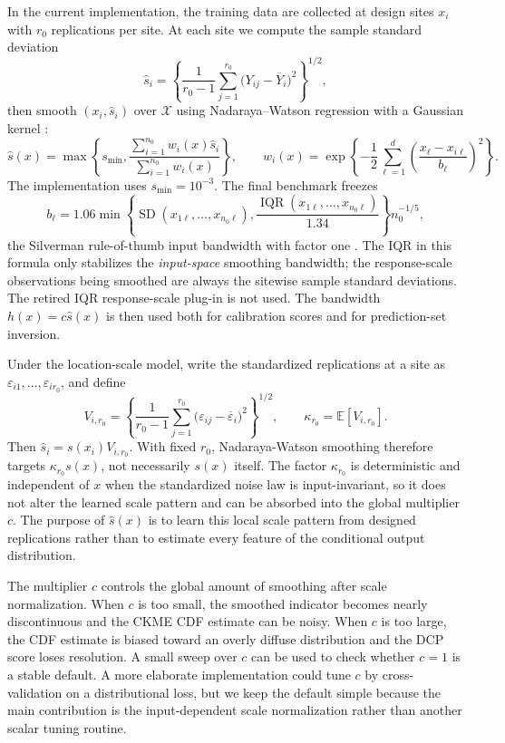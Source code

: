 \documentclass[11pt]{article}
\newcommand{\Xcal}{\mathcal X}
\newcommand{\E}{\mathbb E}
\begin{document}
In the current implementation, the training data are collected at design sites \(x_i\) with \(r_0\) replications per site. At each site we compute the sample standard deviation
\[
  \widehat s_i=
  \left\{\frac{1}{r_0-1}\sum_{j=1}^{r_0}
  \bigl(Y_{ij}-\overline Y_i\bigr)^2\right\}^{1/2},
\]
then smooth \((x_i,\widehat s_i)\) over \(\Xcal\) using Nadaraya--Watson regression with a Gaussian kernel \cite{nadaraya1964,watson1964,hardle1990}:
\[
  \widehat s(x)
  =
  \max\left\{
  s_{\min},
  \frac{\sum_{i=1}^{n_0}w_i(x)\widehat s_i}
       {\sum_{i=1}^{n_0}w_i(x)}
  \right\},
  \qquad
  w_i(x)
  =
  \exp\left\{
  -\frac12\sum_{\ell=1}^d
  \left(\frac{x_\ell-x_{i\ell}}{b_\ell}\right)^2
  \right\}.
\]
The implementation uses \(s_{\min}=10^{-3}\). The final benchmark freezes
\[
  b_\ell
  =
  1.06
  \min\left\{
  \operatorname{SD}(x_{1\ell},\ldots,x_{n_0\ell}),
  \frac{\operatorname{IQR}(x_{1\ell},\ldots,x_{n_0\ell})}{1.34}
  \right\}
  n_0^{-1/5},
\]
the Silverman rule-of-thumb input bandwidth with factor one
\cite{silverman1986}. The IQR in this formula only stabilizes the
\emph{input-space} smoothing bandwidth; the response-scale observations being
smoothed are always the sitewise sample standard deviations. The retired IQR
response-scale plug-in is not used. The bandwidth \(h(x)=c\widehat s(x)\) is
then used both for calibration scores and for prediction-set inversion.

Under the location-scale model, write the standardized replications at a site as \(\varepsilon_{i1},\ldots,\varepsilon_{ir_0}\), and define
\[
  V_{i,r_0}
  =
  \left\{\frac{1}{r_0-1}\sum_{j=1}^{r_0}
  \bigl(\varepsilon_{ij}-\overline\varepsilon_i\bigr)^2\right\}^{1/2},
  \qquad
  \kappa_{r_0}=\E[V_{i,r_0}].
\]
Then \(\widehat s_i=s(x_i)V_{i,r_0}\). With fixed \(r_0\), Nadaraya-Watson smoothing therefore targets \(\kappa_{r_0}s(x)\), not necessarily \(s(x)\) itself. The factor \(\kappa_{r_0}\) is deterministic and independent of \(x\) when the standardized noise law is input-invariant, so it does not alter the learned scale pattern and can be absorbed into the global multiplier \(c\). The purpose of \(\widehat s(x)\) is to learn this local scale pattern from designed replications rather than to estimate every feature of the conditional output distribution.

The multiplier \(c\) controls the global amount of smoothing after scale normalization. When \(c\) is too small, the smoothed indicator becomes nearly discontinuous and the CKME CDF estimate can be noisy. When \(c\) is too large, the CDF estimate is biased toward an overly diffuse distribution and the DCP score loses resolution. A small sweep over \(c\) can be used to check whether \(c=1\) is a stable default. A more elaborate implementation could tune \(c\) by cross-validation on a distributional loss, but we keep the default simple because the main contribution is the input-dependent scale normalization rather than another scalar tuning routine.
\end{document}
